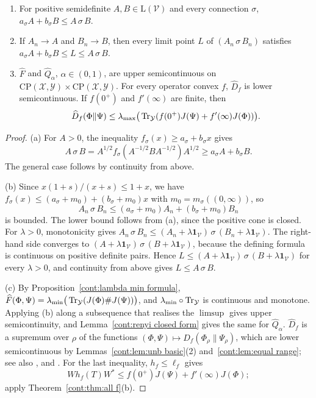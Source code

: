 \begin{lemma}[Envelope]\label{cont:lem:envelope}
\begin{enumerate}
\item[(a)] For positive semidefinite $A,B\in\mathrm{L}(\mathcal{V})$ and every connection $\sigma$, $a_\sigma A+b_\sigma B\leq A\,\sigma\,B$.
\item[(b)] If $A_n\to A$ and $B_n\to B$, then every limit point $L$ of $(A_n\,\sigma\,B_n)$ satisfies $a_\sigma A+b_\sigma B\leq L\leq A\,\sigma\,B$.
\item[(c)] $\widehat F$ and $\widehat Q_\alpha$, $\alpha\in(0,1)$, are upper semicontinuous on $\mathrm{CP}(\mathcal{X},\mathcal{Y})\times\mathrm{CP}(\mathcal{X},\mathcal{Y})$. For every operator convex $f$, $\widehat D_f$ is lower semicontinuous. If $f(0^+)$ and $f'(\infty)$ are finite, then
\[
\widehat D_f(\Phi\|\Psi)\leq\lambda_{\max}\big(\operatorname{Tr}_{\mathcal{Y}}(f(0^+)J(\Psi)+f'(\infty)J(\Phi))\big).
\]
\end{enumerate}
\end{lemma}

\begin{proof}
(a) For $A>0$, the inequality $f_\sigma(x)\geq a_\sigma+b_\sigma x$ gives
\[
A\,\sigma\,B=A^{1/2}f_\sigma(A^{-1/2}BA^{-1/2})A^{1/2}\geq a_\sigma A+b_\sigma B.
\]
The general case follows by continuity from above.

(b) Since $x(1+s)/(x+s)\leq1+x$, we have $f_\sigma(x)\leq(a_\sigma+m_0)+(b_\sigma+m_0)x$ with $m_0=m_\sigma((0,\infty))$, so
\[
A_n\,\sigma\,B_n\leq(a_\sigma+m_0)A_n+(b_\sigma+m_0)B_n
\]
is bounded. The lower bound follows from (a), since the positive cone is closed. For $\lambda>0$, monotonicity gives $A_n\,\sigma\,B_n\leq(A_n+\lambda\mathbf{1}_{\mathcal{V}})\,\sigma\,(B_n+\lambda\mathbf{1}_{\mathcal{V}})$. The right-hand side converges to $(A+\lambda\mathbf{1}_{\mathcal{V}})\,\sigma\,(B+\lambda\mathbf{1}_{\mathcal{V}})$, because the defining formula is continuous on positive definite pairs. Hence $L\leq(A+\lambda\mathbf{1}_{\mathcal{V}})\,\sigma\,(B+\lambda\mathbf{1}_{\mathcal{V}})$ for every $\lambda>0$, and continuity from above gives $L\leq A\,\sigma\,B$.

(c) By Proposition~\ref{cont:lambda min formula}, $\widehat F(\Phi,\Psi)=\lambda_{\min}\big(\operatorname{Tr}_{\mathcal{Y}}(J(\Phi)\#J(\Psi))\big)$, and $\lambda_{\min}\circ\operatorname{Tr}_{\mathcal{Y}}$ is continuous and monotone. Applying (b) along a subsequence that realises the $\limsup$ gives upper semicontinuity, and Lemma~\ref{cont:renyi closed form} gives the same for $\widehat Q_\alpha$. $\widehat D_f$ is a supremum over $\rho$ of the functions $(\Phi,\Psi)\mapsto\widehat D_f(\Phi_\rho\|\Psi_\rho)$, which are lower semicontinuous by Lemmas~\ref{cont:lem:unb basic}(2) and~\ref{cont:lem:equal range}; see also \cite[Section~5]{Hiai2019maximal}, \cite[Theorem~A.4]{MosonyiHiai2024} and \cite{Matsumoto2018newf}. For the last inequality, $h_f\leq\ell_f$ gives
\[
Wh_f(T)W^*\leq f(0^+)J(\Psi)+f'(\infty)J(\Phi);
\]
apply Theorem~\ref{cont:thm:all f}(b).
\end{proof}

